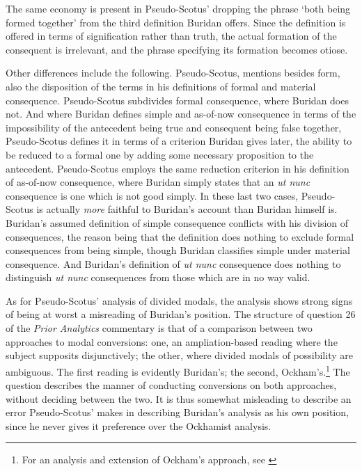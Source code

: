 \documentclass[]{article}
\begin{document}
The same economy is present in Pseudo-Scotus' dropping the phrase `both being formed together' from the third definition Buridan offers. Since the definition is offered in terms of signification rather than truth, the actual formation of the consequent is irrelevant, and the phrase specifying its formation becomes otiose.

Other differences include the following. Pseudo-Scotus, mentions besides form, also the disposition of the terms in his definitions of formal and material consequence. Pseudo-Scotus subdivides formal consequence, where Buridan does not. And where Buridan defines simple and as-of-now consequence in terms of the impossibility of the antecedent being true and consequent being false together, Pseudo-Scotus defines it in terms of a criterion Buridan gives later, the ability to be reduced to a formal one by adding some necessary proposition to the antecedent. Pseudo-Scotus employs the same reduction criterion in his definition of as-of-now consequence, where Buridan simply states that an \textit{ut nunc} consequence is one which is not good simply. In these last two cases, Pseudo-Scotus is actually \textit{more} faithful to Buridan's account than Buridan himself is. Buridan's assumed definition of simple consequence conflicts with his division of consequences, the reason being that the definition does nothing to exclude formal consequences from being simple, though Buridan classifies simple under material consequence. And Buridan's definition of \textit{ut nunc} consequence does nothing to distinguish \textit{ut nunc} consequences from those which are in no way valid.

As for Pseudo-Scotus' analysis of divided modals, the analysis shows strong signs of being at worst a misreading of Buridan's position. The structure of question 26 of the \textit{Prior Analytics} commentary is that of a comparison between two approaches to modal conversions: one, an ampliation-based reading where the subject supposits disjunctively; the other, where divided modals of possibility are ambiguous. The first reading is evidently Buridan's; the second, Ockham's.\footnote{For an analysis and extension of Ockham's approach, see \cite{Archambault2017c}} The question describes the manner of conducting conversions on both approaches, without deciding between the two. It is thus somewhat misleading to describe an error Pseudo-Scotus' makes in describing Buridan's analysis as his own position, since he never gives it preference over the Ockhamist analysis.
\end{document}
